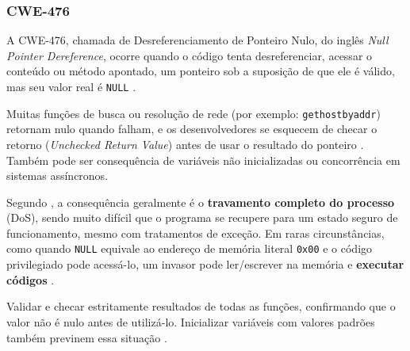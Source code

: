 \documentclass[
    12pt,                %
    openright,           %
    oneside,             %
    a4paper,             %
    english,             %
    brazil               %
]{abntex2}
\begin{document}
\subsubsection{CWE-476}
\label{sec:476}
\par
A CWE-476, chamada de Desreferenciamento de Ponteiro Nulo, do inglês \textit{Null Pointer Dereference}, ocorre quando o código tenta desreferenciar, acessar o conteúdo ou método apontado, um ponteiro sob a suposição de que ele é válido, mas seu valor real é \texttt{NULL} \cite{cwe476}.
\par
Muitas funções de busca ou resolução de rede (por exemplo: \texttt{gethostbyaddr}) retornam nulo quando falham, e os desenvolvedores se esquecem de checar o retorno (\textit{Unchecked Return Value}) antes de usar o resultado do ponteiro \cite{cwe476}.
Também pode ser consequência de variáveis não inicializadas ou concorrência em sistemas assíncronos.
\par
Segundo , a consequência geralmente é o \textbf{travamento completo do processo} (DoS), sendo muito difícil que o programa se recupere para um estado seguro de funcionamento, mesmo com tratamentos de exceção.
Em raras circunstâncias, como quando \texttt{NULL} equivale ao endereço de memória literal \texttt{0x00} e o código privilegiado pode acessá-lo, um invasor pode ler/escrever na memória e \textbf{executar códigos} \cite{cwe476}.
\par
Validar e checar estritamente resultados de todas as funções, confirmando que o valor não é nulo antes de utilizá-lo. Inicializar variáveis com valores padrões também previnem essa situação \cite{cwe476}.
\end{document}
